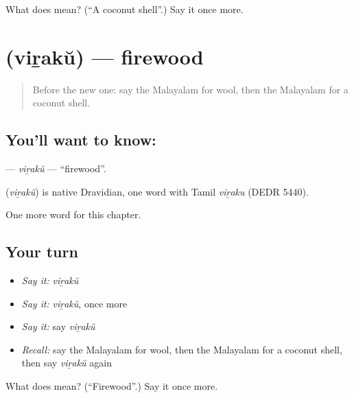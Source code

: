\begin{tcolorbox}[breakable,colback=teal!4,colframe=teal!35!black,title={Before you move on}]
What does  mean? (\textquotedblleft{}A coconut shell\textquotedblright{}.) Say it once more.
\end{tcolorbox}
\section[\texorpdfstring{\ml{വിറക്} (viṟakŭ)}{വിറക് (viṟakŭ)}]{ (viṟakŭ) — firewood}

\label{lesson:ML-C332-viraku}



\begin{quote}
Before the new one: say the Malayalam for wool, then the Malayalam for a coconut shell.
\end{quote}

\subsection*{You'll want to know: }
\textbf{} — \emph{viṟakŭ} — \textquotedblleft{}firewood\textquotedblright{}.

\begin{cousinweb}
\textbf{} (\emph{viṟakŭ}) is native Dravidian, one word with Tamil \emph{viṟaku} (DEDR 5440).
\end{cousinweb}

\begin{grammarlens}[title={What you've built}]
One more word for this chapter.
\end{grammarlens}

\subsection*{Your turn}
\begin{itemize}
\raggedright
  \item \emph{Say it:} \emph{viṟakŭ}
  \item \emph{Say it:} \emph{viṟakŭ}, once more
  \item \emph{Say it:} say \emph{viṟakŭ}
  \item \emph{Recall:} say the Malayalam for wool, then the Malayalam for a coconut shell, then say \emph{viṟakŭ} again
\end{itemize}

\begin{tcolorbox}[breakable,colback=teal!4,colframe=teal!35!black,title={Before you move on}]
What does  mean? (\textquotedblleft{}Firewood\textquotedblright{}.) Say it once more.
\end{tcolorbox}

